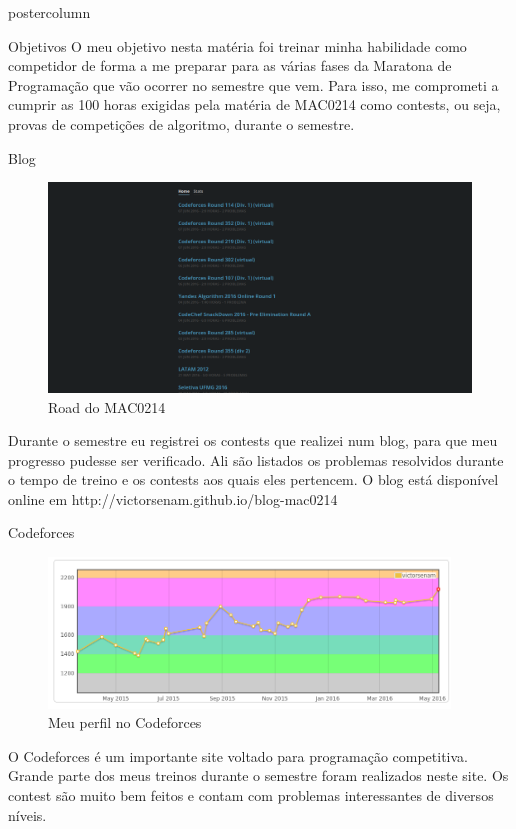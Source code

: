 \documentclass[final]{beamer}
\begin{document}
\begin{frame}
\begin{columns}
\begin{column}{.5\textwidth}
\begin{beamercolorbox}[center,wd=\textwidth]{postercolumn}
\begin{minipage}[T]{.95\textwidth}
{    \begin{block}{Objetivos}
        O meu objetivo nesta matéria foi treinar minha habilidade como competidor de forma a me preparar para as várias fases da Maratona de Programação que vão ocorrer no semestre que vem. Para isso, me comprometi a cumprir as 100 horas exigidas pela matéria de MAC0214 como contests, ou seja, provas de competições de algoritmo, durante o semestre.
        \end{block}
    \begin{block}{Blog}
        \begin{figure}[h]
        \includegraphics[scale=.40]{blog.png}
    \caption{Road do MAC0214}
    \end{figure}
    Durante o semestre eu registrei os contests que realizei num blog, para que meu progresso pudesse ser verificado. Ali são listados os problemas resolvidos durante o tempo de treino e os contests aos quais eles pertencem. O blog está disponível online em http://victorsenam.github.io/blog-mac0214
        \end{block}
    \begin{block}{Codeforces}
    \begin{figure}
    \centering
        \includegraphics[width=0.95\textwidth]{codeforces.png}
    \caption{Meu perfil no Codeforces}
    \end{figure} 
    O Codeforces é um importante site voltado para programação competitiva. Grande parte dos meus treinos durante o semestre foram realizados neste site. Os contest são muito bem feitos e contam com problemas interessantes de diversos níveis.


\end{block}}
\end{minipage}
\end{beamercolorbox}
\end{column}
\end{columns}
\end{frame}
\end{document}
